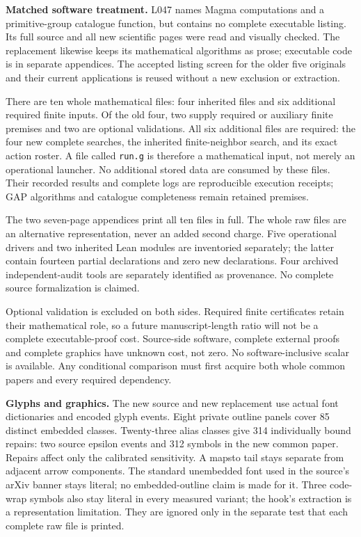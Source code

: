 \documentclass[11pt]{article}
\begin{document}
\newpage
\textbf{Matched software treatment.}
L047 names Magma computations and a primitive-group catalogue function, but
contains no complete executable listing. Its full source and all new scientific
pages were read and visually checked. The replacement likewise keeps its
mathematical algorithms as prose; executable code is in separate appendices.
The accepted listing screen for the older five originals and their current
applications is reused without a new exclusion or extraction.

There are ten whole mathematical files: four inherited files and six additional
required finite inputs. Of the old four, two supply required or auxiliary finite
premises and two are optional validations. All six additional files are required:
the four new complete searches, the inherited finite-neighbor search, and its
exact action roster. A file called \texttt{run.g} is therefore a mathematical
input, not merely an operational launcher. No additional stored data are
consumed by these files. Their recorded results and complete logs are
reproducible execution receipts; GAP algorithms and catalogue completeness
remain retained premises.

The two seven-page appendices print all ten files in full. The whole raw files
are an alternative representation, never an added second charge. Five
operational drivers and two inherited Lean modules are inventoried separately;
the latter contain fourteen partial declarations and zero new declarations.
Four archived independent-audit tools are separately identified as provenance.
No complete source formalization is claimed.

Optional validation is excluded on both sides. Required finite certificates
retain their mathematical role, so a future manuscript-length ratio will not be
a complete executable-proof cost. Source-side software, complete external
proofs and complete graphics have unknown cost, not zero. No software-inclusive
scalar is available. Any conditional comparison must first acquire both whole
common papers and every required dependency.

\textbf{Glyphs and graphics.}
The new source and new replacement use actual font dictionaries and encoded
glyph events. Eight private outline panels cover 85 distinct embedded classes.
Twenty-three alias classes give 314 individually bound repairs: two source
epsilon events and 312 symbols in the new common paper. Repairs affect only
the calibrated sensitivity. A mapsto tail stays separate from adjacent arrow
components. The standard unembedded font used in the source's arXiv banner
stays literal; no embedded-outline claim is made for it. Three code-wrap
symbols also stay literal in every measured variant; the hook's extraction is
a representation limitation. They are ignored only in the separate test that
each complete raw file is printed.
\end{document}
